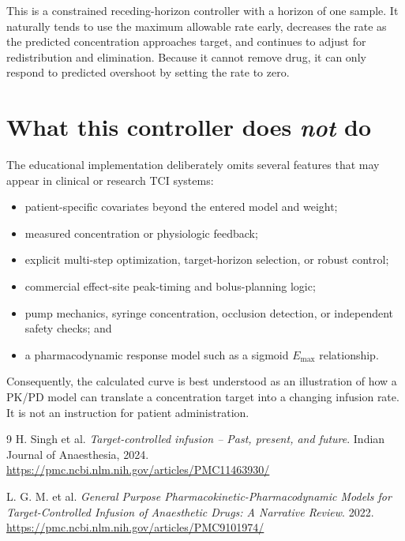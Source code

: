 \documentclass[11pt]{article}
\begin{document}
This is a constrained receding-horizon controller with a horizon of one sample. It naturally tends to use the maximum allowable rate early, decreases the rate as the predicted concentration approaches target, and continues to adjust for redistribution and elimination. Because it cannot remove drug, it can only respond to predicted overshoot by setting the rate to zero.

\section{What this controller does \emph{not} do}

The educational implementation deliberately omits several features that may appear in clinical or research TCI systems:
\begin{itemize}
  \item patient-specific covariates beyond the entered model and weight;
  \item measured concentration or physiologic feedback;
  \item explicit multi-step optimization, target-horizon selection, or robust control;
  \item commercial effect-site peak-timing and bolus-planning logic;
  \item pump mechanics, syringe concentration, occlusion detection, or independent safety checks; and
  \item a pharmacodynamic response model such as a sigmoid $E_{\max}$ relationship.
\end{itemize}
Consequently, the calculated curve is best understood as an illustration of how a PK/PD model can translate a concentration target into a changing infusion rate. It is not an instruction for patient administration.

\begin{thebibliography}{9}
H. Singh et al. \emph{Target-controlled infusion -- Past, present, and future}. Indian Journal of Anaesthesia, 2024. \url{https://pmc.ncbi.nlm.nih.gov/articles/PMC11463930/}

L. G. M. et al. \emph{General Purpose Pharmacokinetic-Pharmacodynamic Models for Target-Controlled Infusion of Anaesthetic Drugs: A Narrative Review}. 2022. \url{https://pmc.ncbi.nlm.nih.gov/articles/PMC9101974/}
\end{thebibliography}
\end{document}
